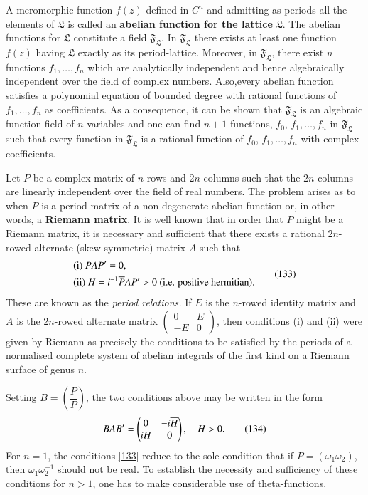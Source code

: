 A meromorphic function $f(z)$ defined in $C^{n}$ and admitting as
periods all the elements of $\mathfrak{L}$ is called an {\bf abelian
  function for the lattice} $\mathfrak{L}$. The abelian functions for
$\mathfrak{L}$ constitute a field $\mathfrak{F}_{\mathfrak{L}}$. In
$\mathfrak{F}_{\mathfrak{L}}$ there exists at least one function
$f(z)$ having $\mathfrak{L}$ exactly as its period-lattice. Moreover,
in $\mathfrak{F}_{\mathfrak{L}}$, there exist $n$ functions
$f_{1},\ldots,f_{n}$ which are analytically independent and hence
algebraically independent over the field of complex
numbers. Also,\pageoriginale every abelian function satisfies a
polynomial equation of bounded degree with rational functions of
$f_{1},\ldots,f_{n}$ as coefficients. As a consequence, it can be
shown that $\mathfrak{F}_{\mathfrak{L}}$ is an algebraic function
field of $n$ variables and one can find $n+1$ functions, $f_{0}$,
$f_{1},\ldots,f_{n}$ in $\mathfrak{F}_{\mathfrak{L}}$ such that every
function in $\mathfrak{F}_{\mathfrak{L}}$ is a rational function of
$f_{0}$, $f_{1},\ldots,f_{n}$ with complex coefficients.

Let $P$ be a complex matrix of $n$ rows and $2n$ columns such that the
$2n$ columns are linearly independent over the field of real
numbers. The problem arises as to when $P$ is a period-matrix of a
non-degenerate abelian function or, in other words, a {\bf Riemann
  matrix}. It is well known that in order that $P$ might be a Riemann
matrix, it is necessary and sufficient that there exists a rational
$2n$-rowed alternate (skew-symmetric) matrix $A$ such that
\begin{equation*}
\begin{aligned}
& {\rm (i)}~ PAP'=0,\\
& {\rm (ii)}~ H=i^{-1}\overline{P}AP'>0 \text{ ({i.e.}\kern.3empositive hermitian).}
\end{aligned}\tag{133}\label{133}
\end{equation*}
These are known as the {\em period relations.} If $E$ is the $n$-rowed
identity matrix and $A$ is the $2n$-rowed alternate matrix
$\left(\begin{smallmatrix} 0 & E\\ -E & 0
\end{smallmatrix}\right)$, then conditions (i) and (ii) were given by
Riemann as precisely the conditions to be satisfied by the periods of
a normalised complete system of abelian integrals of the first kind on
a Riemann surface of genus $n$.

Setting $B=\left(\dfrac{P}{P}\right)$, the two conditions above may be
written in the form
\begin{equation*}
BAB'=
\begin{pmatrix}
0 & -i\overline{H}\\
iH & 0
\end{pmatrix},\quad H>0.\tag{134}\label{134}
\end{equation*}
For $n=1$, the conditions \eqref{133} reduce to the sole condition
that if $P=(\omega_{1}\omega_{2})$, then $\omega_{1}\omega^{-1}_{2}$
should not be real. To establish the necessity and sufficiency of
these conditions for $n>1$, one has to make considerable use of
theta-functions.


